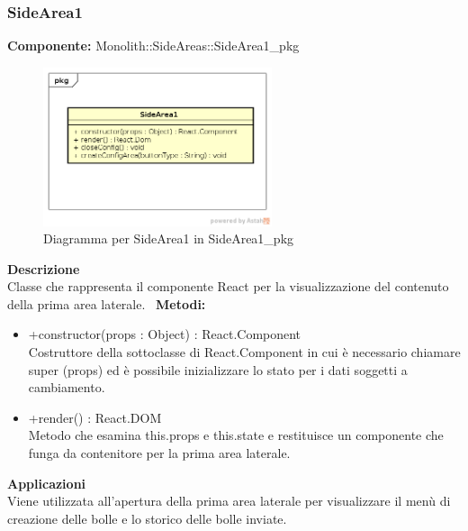 \clearpage

\subsubsection{SideArea1}
\textbf{Componente:}  Monolith::SideAreas::SideArea1\_pkg\\
   \FloatBarrier
   \begin{figure}[ht]
   \centering
   \includegraphics[width=0.6\textwidth]{img/single-SideArea1}
   \caption{{Diagramma per SideArea1 in SideArea1\_pkg}}
\end{figure}
\FloatBarrier
\textbf{Descrizione}\\
Classe che rappresenta il componente React per la visualizzazione del contenuto della prima area laterale. \ 
\textbf{Metodi:}
\begin{itemize}

\item +constructor(props : Object) : React.Component 
\\
Costruttore della sottoclasse di React.Component in cui è necessario chiamare super (props) ed è possibile inizializzare lo stato per i dati soggetti a cambiamento.

\item +render() : React.DOM 
\\
Metodo che esamina this.props e this.state e restituisce un componente che funga da contenitore per la prima area laterale.

\end{itemize} 


\textbf{Applicazioni}\\
Viene utilizzata all'apertura della prima area laterale per visualizzare il menù di creazione delle bolle e lo storico delle bolle inviate. 


\clearpage

